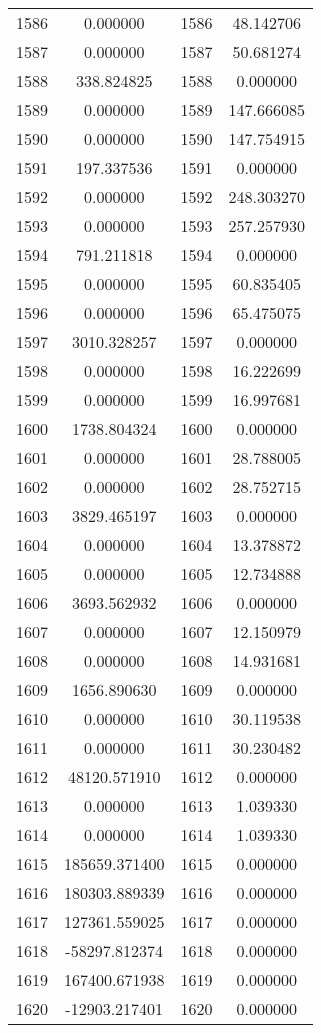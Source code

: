 \documentclass[12pt]{article}
\begin{document}
\begin{longtable}{@{}cccc@{}}
1586 & 0.000000 & 1586 & 48.142706 \\
1587 & 0.000000 & 1587 & 50.681274 \\
1588 & 338.824825 & 1588 & 0.000000 \\
1589 & 0.000000 & 1589 & 147.666085 \\
1590 & 0.000000 & 1590 & 147.754915 \\
1591 & 197.337536 & 1591 & 0.000000 \\
1592 & 0.000000 & 1592 & 248.303270 \\
1593 & 0.000000 & 1593 & 257.257930 \\
1594 & 791.211818 & 1594 & 0.000000 \\
1595 & 0.000000 & 1595 & 60.835405 \\
1596 & 0.000000 & 1596 & 65.475075 \\
1597 & 3010.328257 & 1597 & 0.000000 \\
1598 & 0.000000 & 1598 & 16.222699 \\
1599 & 0.000000 & 1599 & 16.997681 \\
1600 & 1738.804324 & 1600 & 0.000000 \\
1601 & 0.000000 & 1601 & 28.788005 \\
1602 & 0.000000 & 1602 & 28.752715 \\
1603 & 3829.465197 & 1603 & 0.000000 \\
1604 & 0.000000 & 1604 & 13.378872 \\
1605 & 0.000000 & 1605 & 12.734888 \\
1606 & 3693.562932 & 1606 & 0.000000 \\
1607 & 0.000000 & 1607 & 12.150979 \\
1608 & 0.000000 & 1608 & 14.931681 \\
1609 & 1656.890630 & 1609 & 0.000000 \\
1610 & 0.000000 & 1610 & 30.119538 \\
1611 & 0.000000 & 1611 & 30.230482 \\
1612 & 48120.571910 & 1612 & 0.000000 \\
1613 & 0.000000 & 1613 & 1.039330 \\
1614 & 0.000000 & 1614 & 1.039330 \\
1615 & 185659.371400 & 1615 & 0.000000 \\
1616 & 180303.889339 & 1616 & 0.000000 \\
1617 & 127361.559025 & 1617 & 0.000000 \\
1618 & -58297.812374 & 1618 & 0.000000 \\
1619 & 167400.671938 & 1619 & 0.000000 \\
1620 & -12903.217401 & 1620 & 0.000000 \\

\end{longtable}
\end{document}
